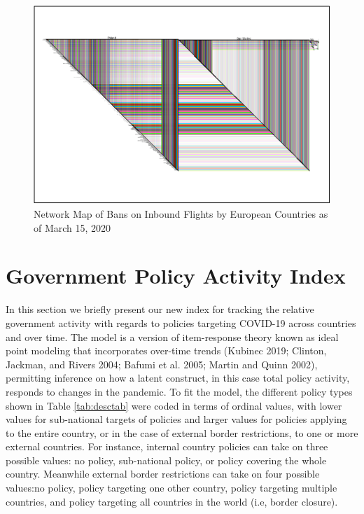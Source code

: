 \documentclass[]{article}
\begin{document}
\begin{figure}
\centering
\includegraphics{corona_wp_files/figure-latex/biofe-1.pdf}
\caption{\label{fig:biofe}Network Map of Bans on Inbound Flights by European Countries as of March 15, 2020}
\end{figure}

\hypertarget{government-policy-activity-index}{%
\section{Government Policy Activity Index}\label{government-policy-activity-index}}

In this section we briefly present our new index for tracking the relative government activity with regards to policies targeting COVID-19 across countries and over time. The model is a version of item-response theory known as ideal point modeling that incorporates over-time trends (Kubinec 2019; Clinton, Jackman, and Rivers 2004; Bafumi et al. 2005; Martin and Quinn 2002), permitting inference on how a latent construct, in this case total policy activity, responds to changes in the pandemic. To fit the model, the different policy types shown in Table \ref{tab:desctab} were coded in terms of ordinal values, with lower values for sub-national targets of policies and larger values for policies applying to the entire country, or in the case of external border restrictions, to one or more external countries. For instance, internal country policies can take on three possible values: no policy, sub-national policy, or policy covering the whole country. Meanwhile external border restrictions can take on four possible values:no policy, policy targeting one other country, policy targeting multiple countries, and policy targeting all countries in the world (i.e, border closure).
\end{document}
